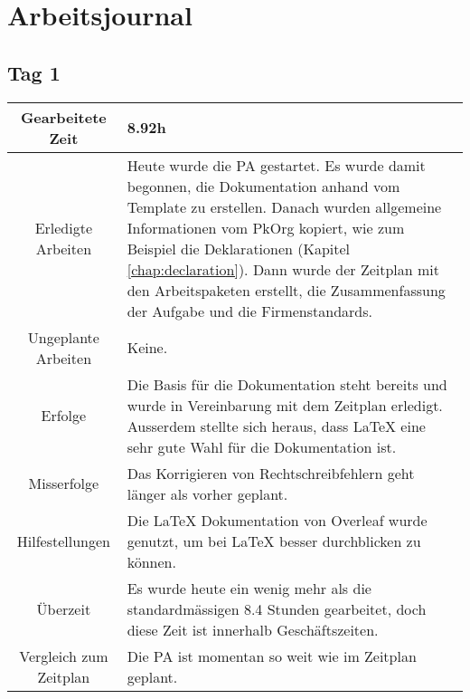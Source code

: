 \chapter{Arbeitsjournal}

\section{Tag 1}
\begin{tabularx}{\textwidth}[H]{|c|X|}
  \hline
  Gearbeitete Zeit & 8.92h \\ \hline
  Erledigte Arbeiten & Heute wurde die PA gestartet. Es wurde damit begonnen, die Dokumentation anhand vom Template
  \cite{Buhler_ipa-template_2022} zu erstellen. Danach wurden allgemeine Informationen vom PkOrg kopiert, wie zum
  Beispiel die Deklarationen (Kapitel \ref{chap:declaration}).
  Dann wurde der Zeitplan mit den Arbeitspaketen erstellt, die Zusammenfassung der Aufgabe und die
  Firmenstandards. \\ \hline
  Ungeplante Arbeiten & Keine. \\ \hline
  Erfolge & Die Basis für die Dokumentation steht bereits und wurde in Vereinbarung mit dem Zeitplan erledigt. Ausserdem stellte
  sich heraus, dass LaTeX eine sehr gute Wahl für die Dokumentation ist.
  \\ \hline
  Misserfolge & Das Korrigieren von Rechtschreibfehlern geht länger als vorher geplant.  \\ \hline
  Hilfestellungen & Die LaTeX Dokumentation von Overleaf \cite{overleaf} wurde genutzt, um bei LaTeX besser durchblicken zu
  können. \\ \hline
  Überzeit & Es wurde heute ein wenig mehr als die standardmässigen 8.4 Stunden gearbeitet, doch diese Zeit ist
  innerhalb Geschäftszeiten. \\ \hline
  Vergleich zum Zeitplan & Die PA ist momentan so weit wie im Zeitplan geplant. \\ \hline
\end{tabularx}

\newpage

